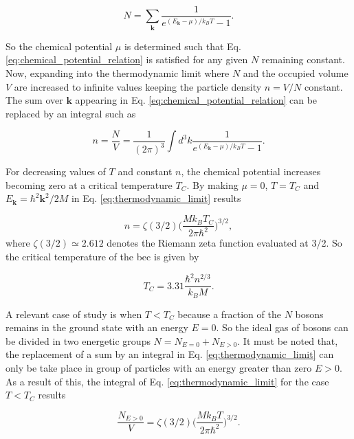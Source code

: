 \begin{equation}\label{eq:chemical_potential_relation}
N = \sum_{\mathbf{k}}\frac{1}{e^{(E_\mathbf{k} - \mu)/k_B T} - 1}.
\end{equation}

So the chemical potential $\mu$ is determined such that Eq. \eqref{eq:chemical_potential_relation} is satisfied for any given $N$ remaining constant. Now, expanding into the thermodynamic limit where $N$ and the occupied volume $V$ are increased to infinite values keeping the particle density $n = V/N$ constant. The sum over $\mathbf{k}$ appearing in Eq. \eqref{eq:chemical_potential_relation} can be replaced by an integral such as

\begin{equation}\label{eq:thermodynamic_limit}
n = \frac{N}{V} =  \frac{1}{(2\pi)^3}\int d^3 k\frac{1}{e^{(E_\mathbf{k} - \mu)/k_B T} - 1}.
\end{equation}

For decreasing values of $T$ and constant $n$, the chemical potential increases becoming zero at a critical temperature $T_C$. By making $\mu = 0$, $T = T_C$ and $E_\mathbf{k} = \hbar^2 \mathbf{k}^2 / 2M$ in Eq. \eqref{eq:thermodynamic_limit} results

\begin{equation}\label{eq:thermodynamic_limit_at_critical_conditions}
n =  \zeta(3/2) \bigg(\frac{M k_B T_C}{2 \pi \hbar^2}\bigg)^{3/2},
\end{equation}
where $\zeta(3/2) \simeq 2.612$ denotes the Riemann zeta function evaluated at 3/2. So the critical temperature of the \ac{bec} is given by

\begin{equation}\label{eq:critical_temperature}
T_C = 3.31 \frac{\hbar^2 n^{2/3}}{k_B M}.
\end{equation}

A relevant case of study is when $T < T_C$ because a fraction of the $N$ bosons remains in the ground state with an energy $E = 0$. So the ideal gas of bosons can be divided in two energetic groups $N = N_{E=0} + N_{E>0}$. It must be noted that, the replacement of a sum by an integral in Eq. \eqref{eq:thermodynamic_limit} can only be take place in group of particles with an energy greater than zero $E>0$. As a result of this, the integral of Eq. \eqref{eq:thermodynamic_limit} for the case $T < T_C$ results

\begin{equation}\label{eq:thermodynamic_limit_low_T}
\frac{N_{E>0}}{V} = \zeta(3/2) \bigg(\frac{M k_B T}{2 \pi \hbar^2}\bigg)^{3/2}.
\end{equation}

